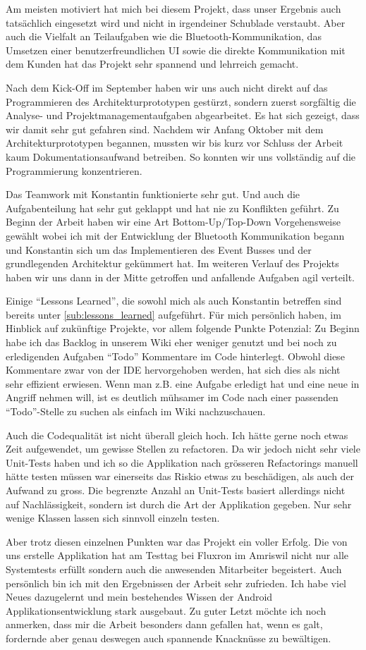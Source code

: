 Am meisten motiviert hat mich bei diesem Projekt, dass unser Ergebnis auch tatsächlich eingesetzt wird und nicht in irgendeiner Schublade verstaubt. Aber auch die Vielfalt an Teilaufgaben wie die Bluetooth-Kommunikation, das Umsetzen einer benutzerfreundlichen UI sowie die direkte Kommunikation mit dem Kunden  hat das Projekt sehr spannend und lehrreich gemacht. 

Nach dem Kick-Off im September haben wir uns auch nicht direkt auf das Programmieren des Architekturprototypen gestürzt, sondern zuerst sorgfältig die Analyse- und Projektmanagementaufgaben abgearbeitet. Es hat sich gezeigt, dass wir damit sehr gut gefahren sind. Nachdem wir Anfang Oktober mit dem Architekturprototypen begannen, mussten wir bis kurz vor Schluss der Arbeit kaum Dokumentationsaufwand betreiben. So konnten wir uns vollständig auf die Programmierung konzentrieren. 

Das Teamwork mit Konstantin funktionierte sehr gut. Und auch die Aufgabenteilung hat sehr gut geklappt und hat nie zu Konflikten geführt. Zu Beginn der Arbeit haben wir eine Art Bottom-Up/Top-Down Vorgehensweise gewählt wobei ich mit der Entwicklung der Bluetooth Kommunikation begann und Konstantin sich um das Implementieren des Event Busses und der grundlegenden Architektur gekümmert hat. Im weiteren Verlauf des Projekts haben wir uns dann in der Mitte getroffen und anfallende Aufgaben agil verteilt.

Einige \enquote{Lessons Learned}, die sowohl mich als auch Konstantin betreffen sind bereits unter \ref{sub:lessons_learned} aufgeführt. Für mich persönlich haben, im Hinblick auf zukünftige Projekte, vor allem folgende Punkte Potenzial: Zu Beginn habe ich das Backlog in unserem Wiki eher weniger genutzt und bei noch zu erledigenden Aufgaben \enquote{Todo} Kommentare im Code hinterlegt. Obwohl diese Kommentare zwar von der \ac{IDE} hervorgehoben werden, hat sich dies als nicht sehr effizient erwiesen. Wenn man z.B. eine Aufgabe erledigt hat und eine neue in Angriff nehmen will, ist es deutlich mühsamer im Code nach einer passenden \enquote{Todo}-Stelle zu suchen als einfach im Wiki nachzuschauen.

Auch die Codequalität ist nicht überall gleich hoch. Ich hätte gerne noch etwas Zeit aufgewendet, um gewisse Stellen zu refactoren. Da wir jedoch nicht sehr viele Unit-Tests haben und ich so die Applikation nach grösseren Refactorings manuell hätte testen müssen war einerseits das Riskio etwas zu beschädigen, als auch der Aufwand zu gross. Die begrenzte Anzahl an Unit-Tests basiert allerdings nicht auf Nachlässigkeit, sondern ist durch die Art der Applikation gegeben. Nur sehr wenige Klassen lassen sich sinnvoll einzeln testen. 

Aber trotz diesen einzelnen Punkten war das Projekt ein voller Erfolg. Die von uns erstelle Applikation hat am Testtag bei Fluxron im Amriswil nicht nur alle Systemtests erfüllt sondern auch die anwesenden Mitarbeiter begeistert. Auch persönlich bin ich mit den Ergebnissen der Arbeit sehr zufrieden. Ich habe viel Neues dazugelernt und mein bestehendes Wissen der Android Applikationsentwicklung stark ausgebaut. Zu guter Letzt möchte ich noch anmerken, dass mir die Arbeit besonders dann gefallen hat, wenn es galt, fordernde aber genau deswegen auch spannende Knacknüsse zu bewältigen.